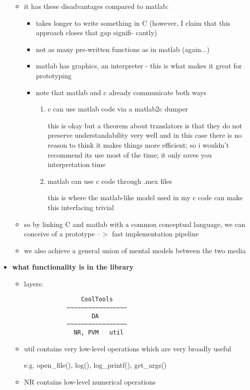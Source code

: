 \begin{itemize}
\begin{itemize}
	\item it has these disadvantages compared to matlab:
		\begin{itemize}			
		\item takes longer to write something in C
				(however, I claim that this approach closes that gap signifi-
				cantly)
		\item not as many pre-written functions as in matlab
				(again...)
		\item matlab has graphics, an interpreter - this is what makes it great
				for prototyping
		\item note that matlab and c already communicate both ways
		\begin{enumerate}
			\item c can use matlab code via a matlab2c dumper

				this is okay but a theorem about translators is that they do
					not preserve understandability very well and in this case
					there is no reason to think it makes things more efficient;
				so i wouldn't recommend its use most of the time; it only saves
					you interpretation time

			\item matlab can use c code through .mex files

				this is where the matlab-like model used in my c code can make
					this interfacing trivial
		\end{enumerate}
		\end{itemize}

	\item so by linking C and matlab with a common conceptual language, we 
			can conceive of a prototype --$>$ fast implementation 
			pipeline
	\item we also achieve a general union of mental models between the two 
			media
		\end{itemize}

\item {\bf what functionality is in the library}
	\begin{itemize}

	\item layers:
		\begin{verbatim}
			    CoolTools
			~~~~~~~~~~~~~~~~~
			       DA
			~~~~~~~~~~~~~~~~~
			  NR, PVM   util
		\end{verbatim}
	\item util contains very low-level operations which are very broadly useful

			e.g. open\_file(), log(), log\_printf(), get\_args()
	\item NR contains low-level numerical operations


\end{itemize}
\end{itemize}
